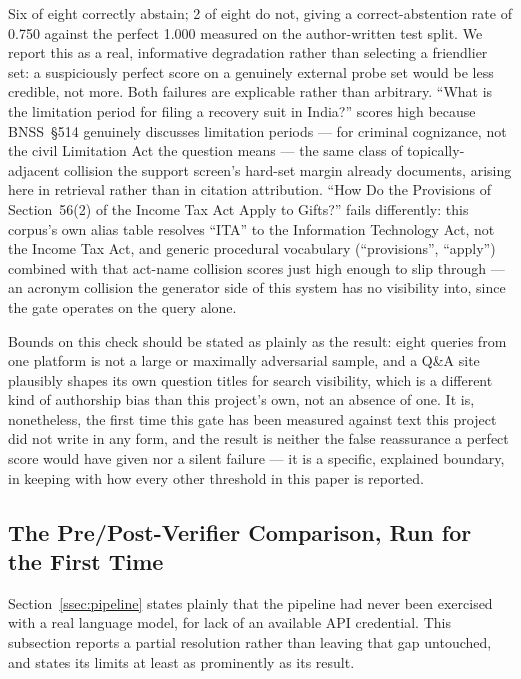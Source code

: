 \documentclass[conference]{IEEEtran}
\begin{document}
Six of eight correctly abstain; 2 of eight do not, giving a correct-abstention rate
of 0.750 against the perfect 1.000 measured on the author-written test
split. We report this as a real, informative degradation rather than
selecting a friendlier set: a suspiciously perfect score on a genuinely
external probe set would be less credible, not more. Both failures are
explicable rather than arbitrary. ``What is the limitation period for
filing a recovery suit in India?'' scores high because BNSS~\S514 genuinely
discusses limitation periods --- for criminal cognizance, not the civil
Limitation Act the question means --- the same class of topically-adjacent
collision the support screen's hard-set margin already documents, arising
here in retrieval rather than in citation attribution. ``How Do the
Provisions of Section~56(2) of the Income Tax Act Apply to Gifts?'' fails
differently: this corpus's own alias table resolves ``ITA'' to the
Information Technology Act, not the Income Tax Act, and generic procedural
vocabulary (``provisions'', ``apply'') combined with that act-name collision
scores just high enough to slip through --- an acronym collision the
generator side of this system has no visibility into, since the gate
operates on the query alone.

Bounds on this check should be stated as plainly as the result: eight
queries from one platform is not a large or maximally adversarial sample,
and a Q\&A site plausibly shapes its own question titles for search
visibility, which is a different kind of authorship bias than this
project's own, not an absence of one. It is, nonetheless, the first time
this gate has been measured against text this project did not write in any
form, and the result is neither the false reassurance a perfect score would
have given nor a silent failure --- it is a specific, explained boundary,
in keeping with how every other threshold in this paper is reported.

\subsection{The Pre/Post-Verifier Comparison, Run for the First Time}
\label{ssec:generation}

Section~\ref{ssec:pipeline} states plainly that the pipeline had never been
exercised with a real language model, for lack of an available API
credential. This subsection reports a partial resolution rather than leaving
that gap untouched, and states its limits at least as prominently as its
result.
\end{document}
